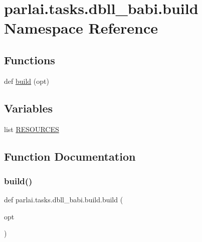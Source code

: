 \hypertarget{namespaceparlai_1_1tasks_1_1dbll__babi_1_1build}{}\section{parlai.\+tasks.\+dbll\+\_\+babi.\+build Namespace Reference}
\label{namespaceparlai_1_1tasks_1_1dbll__babi_1_1build}
\subsection*{Functions}
\begin{DoxyCompactItemize}
\item 
def \hyperlink{namespaceparlai_1_1tasks_1_1dbll__babi_1_1build_a40dc7acf84e5e6146717376b2411d42e}{build} (opt)
\end{DoxyCompactItemize}
\subsection*{Variables}
\begin{DoxyCompactItemize}
\item 
list \hyperlink{namespaceparlai_1_1tasks_1_1dbll__babi_1_1build_a37514f5c86d5523b75f341f02bac1f6f}{R\+E\+S\+O\+U\+R\+C\+ES}
\end{DoxyCompactItemize}


\subsection{Function Documentation}
\mbox{\label{namespaceparlai_1_1tasks_1_1dbll__babi_1_1build_a40dc7acf84e5e6146717376b2411d42e}} 
\subsubsection{\texorpdfstring{build()}{build()}}
{\footnotesize\ttfamily def parlai.\+tasks.\+dbll\+\_\+babi.\+build.\+build (\begin{DoxyParamCaption}\item[{}]{opt }\end{DoxyParamCaption})}



